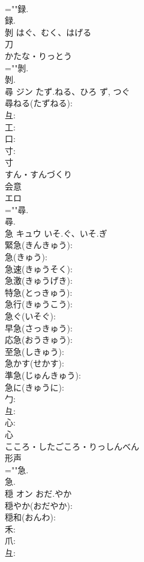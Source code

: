 \documentclass[8pt]{extreport}
\begin{document}
\begin{CJK}{UTF8}{min}
\\	=""録.
\\	録.
\\	剝		はぐ、むく、はげる				
\\	刀	
\\	かたな・りっとう	
\\	=""剝.
\\	剝.
\\	尋	ジン	たず.ねる、ひろ	ず, つぐ	
\\	尋ねる(たずねる): 
\\	彑: 
\\	工: 
\\	口: 
\\	寸: 
\\	寸	
\\	すん・すんづくり	
\\	会意 
\\	エロ 
\\	=""尋.
\\	尋.
\\	急	キュウ	いそ.ぐ、いそ.ぎ		
\\	緊急(きんきゅう): 
\\	急(きゅう): 
\\	急速(きゅうそく): 
\\	急激(きゅうげき): 
\\	特急(とっきゅう): 
\\	急行(きゅうこう): 
\\	急ぐ(いそぐ): 
\\	早急(さっきゅう): 
\\	応急(おうきゅう): 
\\	至急(しきゅう): 
\\	急かす(せかす): 
\\	準急(じゅんきゅう): 
\\	急に(きゅうに): 
\\	勹: 
\\	彑: 
\\	心: 
\\	心	
\\	こころ・したごころ・りっしんべん	
\\	形声 
\\	=""急.
\\	急.
\\	穏	オン	おだ.やか		
\\	穏やか(おだやか): 
\\	穏和(おんわ): 
\\	禾: 
\\	爪: 
\\	彑: 

\end{CJK}
\end{document}
